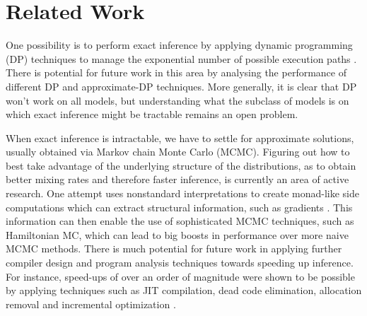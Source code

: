 \chapter{Related Work} 
\label{chap:relWork}

One possibility is to perform exact inference by applying dynamic programming (DP) techniques to manage the exponential number of possible execution paths \cite{stuhlmuller2012dynamic}. There is potential for future work in this area by analysing the performance of different DP and approximate-DP techniques. More generally, it is clear that DP won’t work on all models, but understanding what the subclass
of models is on which exact inference might be tractable remains an open problem. 

When exact inference is intractable, we have to settle for approximate solutions, usually obtained via Markov chain Monte Carlo (MCMC). Figuring out how to best take advantage of the underlying structure
of the distributions, as to obtain better mixing rates and therefore faster inference, is currently an area of active research. One attempt uses nonstandard interpretations to create monad-like side computations which can extract structural information, such as gradients \cite{wingate2011nonstandard}. This information can then enable the use of sophisticated MCMC techniques, such as Hamiltonian MC, which can lead to big boosts in performance over more naive MCMC methods. There is much potential for future work in applying further compiler design and program analysis techniques towards speeding up inference. For instance, speed-ups of over an order of magnitude were shown to be possible by applying techniques such as JIT compilation, dead code elimination, allocation removal and incremental optimization \cite{yang2013incrementalizing}.
